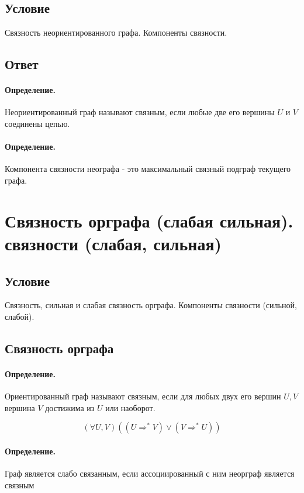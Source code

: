 \documentclass{report}
\newcommand{\pathto}[1][1]{ \Rightarrow^{*}_{#1} }
\begin{document}
\subsection{Условие}
Связность неориентированного графа. Компоненты
связности.

\subsection{Ответ}

\paragraph*{Определение.}
Неориентированный граф называют связным, если любые две его вершины $U$ и  $V$ соединены цепью.

\paragraph*{Определение.}
Компонента связности неографа - это максимальный связный подграф текущего графа.

\newpage

\section{Связность орграфа (слабая сильная).
   связности (слабая, сильная)}
\subsection{Условие}
Связность, сильная и слабая связность орграфа. Компоненты
связности (сильной, слабой).

\subsection{Связность орграфа}

\paragraph*{Определение.}
Ориентированный граф называют связным, если для любых двух его вершин $U, V$ вершина
$V$ достижима из  $U$ или наоборот.

\[
(\forall U,V)((U \Rightarrow^{*} V) \lor (V \pathto[] U))
\] 

\paragraph*{Определение.}
Граф является слабо связанным, если ассоциированный с ним неорграф является связным
\end{document}
